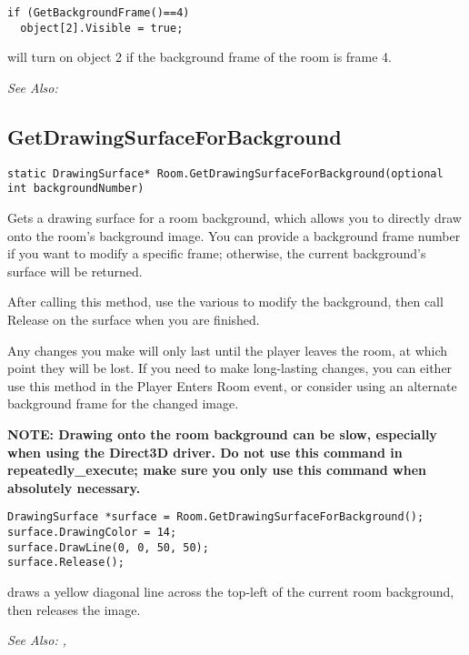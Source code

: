 \begin{verbatim}
if (GetBackgroundFrame()==4)
  object[2].Visible = true;
\end{verbatim}
will turn on object 2 if the background frame of the room is frame 4.

\it{See Also:} 


\subsection{GetDrawingSurfaceForBackground}\label{Room.GetDrawingSurfaceForBackground}%

\begin{verbatim}
static DrawingSurface* Room.GetDrawingSurfaceForBackground(optional int backgroundNumber)
\end{verbatim}
Gets a drawing surface for a room background, which allows you to directly draw
onto the room's background image. You can provide a background frame number if you
want to modify a specific frame; otherwise, the current background's surface will be returned.

After calling this method, use the various  to modify the
background, then call Release on the surface when you are finished.

Any changes you make will only last until the player leaves the room, at
which point they will be lost. If you need to make long-lasting changes, you
can either use this method in the Player Enters Room event, or consider using
an alternate background frame for the changed image.

\bf{NOTE:} Drawing onto the room background can be slow, especially when using the Direct3D
driver. Do not use this command in repeatedly_execute; make sure you only use this command
when absolutely necessary.

\begin{verbatim}
DrawingSurface *surface = Room.GetDrawingSurfaceForBackground();
surface.DrawingColor = 14;
surface.DrawLine(0, 0, 50, 50);
surface.Release();
\end{verbatim}
draws a yellow diagonal line across the top-left of the current room background,
then releases the image.

\it{See Also:} ,


